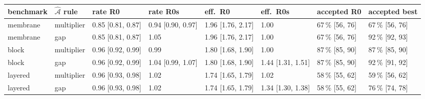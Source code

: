\begin{tabular}{llllllll}
\hline
benchmark & $\hat{\mathcal A}$ rule & rate R0 & rate R0s & eff.\ R0 & eff.\ R0s & accepted R0 & accepted best \\
\hline
membrane & multiplier & 0.85 [0.81, 0.87] & 0.94 [0.90, 0.97] & 1.96 [1.76, 2.17] & 1.00 & 67\,\% [56, 76] & 67\,\% [56, 76] \\
membrane & gap & 0.85 [0.81, 0.87] & 1.05 & 1.96 [1.76, 2.17] & 1.00 & 67\,\% [56, 76] & 92\,\% [92, 93] \\
block & multiplier & 0.96 [0.92, 0.99] & 0.99 & 1.80 [1.68, 1.90] & 1.00 & 87\,\% [85, 90] & 87\,\% [85, 90] \\
block & gap & 0.96 [0.92, 0.99] & 1.04 [0.99, 1.07] & 1.80 [1.68, 1.90] & 1.44 [1.31, 1.51] & 87\,\% [85, 90] & 92\,\% [91, 92] \\
layered & multiplier & 0.96 [0.93, 0.98] & 1.02 & 1.74 [1.65, 1.79] & 1.02 & 58\,\% [55, 62] & 59\,\% [56, 62] \\
layered & gap & 0.96 [0.93, 0.98] & 1.02 & 1.74 [1.65, 1.79] & 1.34 [1.30, 1.38] & 58\,\% [55, 62] & 76\,\% [74, 78] \\
\hline
\end{tabular}
